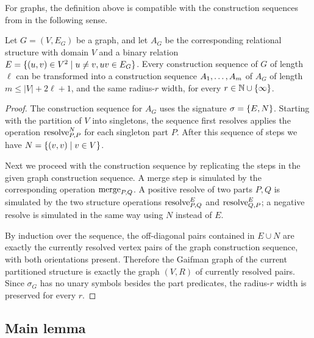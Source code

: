 For graphs, the definition above is compatible with the construction sequences
from  in the following sense.

\begin{lemma}\label{lem:construction-construction}
Let \(G=(V,E_G)\) be a graph, and 
let $A_G$ be the corresponding relational structure with domain $V$ and a binary relation $E=\setof{(u,v)\in V^2}{u\neq v, uv\in E_G}$.
Every construction sequence of \(G\) of
length \(\ell\) can be transformed into a construction sequence
\(\str A_1,\ldots,\str A_m\) of $A_G$ of length \(m\le |V|+2\ell+1\), and the same radius-$r$ width, for every \(r\in\N\cup\{\infty\}\).
\end{lemma}
\begin{proof}   
    The construction sequence for $A_G$ 
    uses the signature $\sigma=\set{E,N}$. Starting with the partition of $V$ into singletons, the sequence first resolves applies the operation $\resolve{N}{P}{P}$ for each singleton part $P$. After this sequence of steps we have $N=\setof{(v,v)}{v\in V}$.
    
    Next we proceed with the construction sequence by replicating the steps in the given graph construction sequence. A merge
step is simulated by the corresponding operation \(\merge PQ\). A positive
resolve of two parts \(P,Q\) is simulated by the two structure operations
\(\resolve EPQ\) and \(\resolve EQP\); a negative resolve is simulated in the
same way using \(N\) instead of \(E\). 

By induction over the sequence, the off-diagonal pairs contained in
\(E\cup N\) are exactly the currently resolved vertex pairs of the graph
construction sequence, with both orientations present. Therefore the Gaifman
graph of the current partitioned structure is exactly the graph \((V,R)\) of
currently resolved pairs. Since \(\sigma_G\) has no unary symbols besides the
part predicates, the radius-\(r\) width is preserved for every \(r\).
\end{proof}



\subsection{Main lemma}




